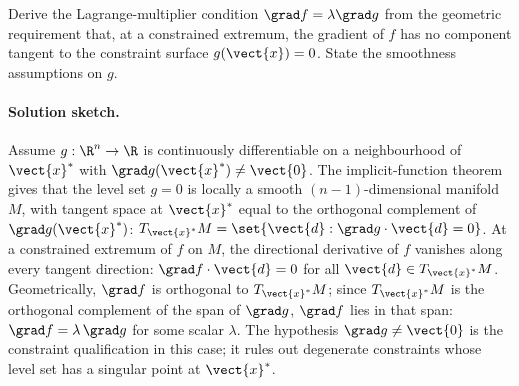 \begin{exercise}
Derive the Lagrange-multiplier condition $\grad f = \lambda \grad g$
from the geometric requirement that, at a constrained extremum, the
gradient of $f$ has no component tangent to the constraint surface
$g(\vect{x}) = 0$. State the smoothness assumptions on $g$.

\paragraph{Solution sketch.} Assume $g : \R^{n} \to \R$ is
continuously differentiable on a neighbourhood of $\vect{x}^{*}$
with $\grad g(\vect{x}^{*}) \neq \vect{0}$. The implicit-function
theorem gives that the level set $g = 0$ is locally a smooth
$(n - 1)$-dimensional manifold $M$, with tangent space at
$\vect{x}^{*}$ equal to the orthogonal complement of $\grad g(
\vect{x}^{*})$: $T_{\vect{x}^{*}} M = \set{\vect{d} : \grad g \cdot
\vect{d} = 0}$. At a constrained extremum of $f$ on $M$, the
directional derivative of $f$ vanishes along every tangent
direction: $\grad f \cdot \vect{d} = 0$ for all $\vect{d} \in
T_{\vect{x}^{*}} M$. Geometrically, $\grad f$ is orthogonal to
$T_{\vect{x}^{*}} M$; since $T_{\vect{x}^{*}} M$ is the orthogonal
complement of the span of $\grad g$, $\grad f$ lies in that span:
$\grad f = \lambda\,\grad g$ for some scalar $\lambda$. The
hypothesis $\grad g \neq \vect{0}$ is the constraint qualification
in this case; it rules out degenerate constraints whose level set
has a singular point at $\vect{x}^{*}$.
\end{exercise}

